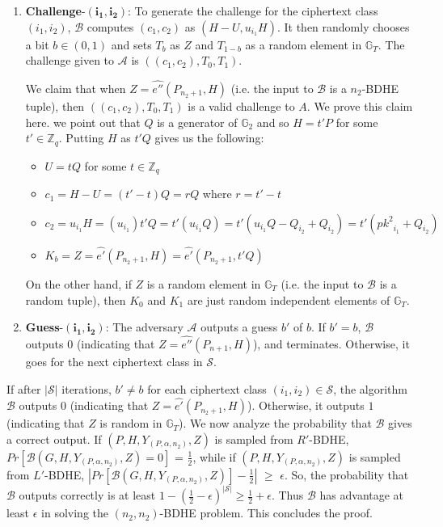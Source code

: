\begin{enumerate}
 \item \textbf{Challenge}-$\mathbf{(i_1,i_2)}$: To generate the challenge for the ciphertext class $(i_1,i_2)$, $\mathcal{B}$ computes $(c_1,c_2)$ as $(H-U,u_{i_1}H)$. It then randomly chooses a bit $b\in{(0,1)}$ and sets $T_b$ as $Z$ and $T_{1-b}$ as a random element in $\mathbb{G}_T$. The challenge given to $\mathcal{A}$ is $((c_1,c_2),T_0,T_1)$. 
 
 We claim that when $Z=\hat{e''}(P_{n_2+1},H)$ (i.e. the input to $\mathcal{B}$ is a $n_2$-BDHE tuple), then $((c_1,c_2),T_0,T_1)$ is a valid challenge to $A$. We prove this claim here. we point out that $Q$ is a generator of $\mathbb{G}_2$ and so $H=t'P$ for some $t'\in\mathbb{Z}_q$. Putting $H$ as $t'Q$ gives us the following:
 \begin{itemize}
  \item  $U=tQ$ for some $t\in\mathbb{Z}_q$
  \item $c_1=H-U=(t'-t)Q=rQ$ where $r=t'-t$
  \item $c_2=u_{i_1}H=(u_{i_1})t'Q=t'(u_{i_1}Q)=t'(u_{i_1}Q-Q_{i_2}+Q_{i_2})=t'({pk^2}_{i_1}+Q_{i_2})$
  \item $K_b=Z=\hat{e'}(P_{n_2+1},H)=\hat{e'}(P_{n_2+1},t'Q)$
 \end{itemize}
 On the other hand, if $Z$ is a random element in $\mathbb{G}_T$ (i.e. the input to $\mathcal{B}$ is a random tuple), then $K_0$ and $K_1$ are just random independent elements of $\mathbb{G}_T$.
 
 \item\textbf{Guess}-$\mathbf{(i_1,i_2)}$: The adversary $\mathcal{A}$ outputs a guess $b'$ of $b$. If $b' = b$, $\mathcal{B}$ outputs $0$ (indicating that $Z = \hat{e''}(P_{n+1},H)$), and terminates. Otherwise, it goes for the next ciphertext class in $\mathcal{S}$.
\end{enumerate}
If after $|\mathcal{S}|$ iterations, $b' \neq b$ for each ciphertext class $(i_1,i_2)\in\mathcal{S}$, the algorithm $\mathcal{B}$ outputs $0$ (indicating that $Z = \hat{e'}(P_{n_2+1},H)$). Otherwise, it outputs $1$ (indicating that $Z$ is random in $\mathbb{G}_T$). We now analyze the probability that $\mathcal{B}$ gives a correct output. If $(P,H,Y_{(P,\alpha,n_2)},Z)$ is sampled from $R'$-BDHE, $Pr[\mathcal{B}(G,H,Y_{(P,\alpha,n_2)},Z)=0]$ = $\frac{1}{2}$, while if $(P,H,Y_{(P,\alpha,n_2)},Z)$ is sampled from $L'$-BDHE, $|Pr[\mathcal{B}(G,H,Y_{(P,\alpha,n_2)},Z)]-\frac{1}{2}|$ $\geq$ $\epsilon$. So, the probability that $\mathcal{B}$ outputs correctly is at least $1-(\frac{1}{2}-\epsilon)^{|\mathcal{S}|} \geq \frac{1}{2}+\epsilon$. Thus $\mathcal{B}$ has advantage at least $\epsilon$ in solving the $(n_2,n_2)$-BDHE problem. This concludes the proof.


